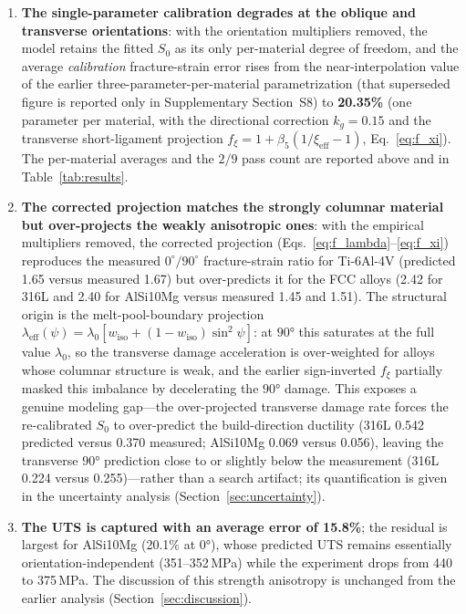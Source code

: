 \documentclass[twocolumn]{sagej}
\begin{document}
\begin{enumerate}\def\labelenumi{(\arabic{enumi})}
    \item \textbf{The single-parameter calibration degrades at the oblique and transverse orientations}: with the orientation multipliers removed, the model retains the fitted $S_0$ as its only per-material degree of freedom, and the average \emph{calibration} fracture-strain error rises from the near-interpolation value of the earlier three-parameter-per-material parametrization (that superseded figure is reported only in Supplementary Section~S8) to \textbf{20.35\%} (one parameter per material, with the directional correction $k_g=0.15$ and the transverse short-ligament projection $f_\xi = 1+\beta_5(1/\xi_\mathrm{eff}-1)$, Eq.~\eqref{eq:f_xi}). The per-material averages and the $2/9$ pass count are reported above and in Table~\ref{tab:results}.
    \item \textbf{The corrected projection matches the strongly columnar material but over-projects the weakly anisotropic ones}: with the empirical multipliers removed, the corrected projection (Eqs.~\eqref{eq:f_lambda}--\eqref{eq:f_xi}) reproduces the measured $0^\circ/90^\circ$ fracture-strain ratio for Ti-6Al-4V (predicted 1.65 versus measured 1.67) but over-predicts it for the FCC alloys (2.42 for 316L and 2.40 for AlSi10Mg versus measured 1.45 and 1.51). The structural origin is the melt-pool-boundary projection $\lambda_{\mathrm{eff}}(\psi) = \lambda_0 [w_{\mathrm{iso}} + (1-w_{\mathrm{iso}})\sin^2\psi]$: at $\ang{90}$ this saturates at the full value $\lambda_0$, so the transverse damage acceleration is over-weighted for alloys whose columnar structure is weak, and the earlier sign-inverted $f_\xi$ partially masked this imbalance by decelerating the $\ang{90}$ damage. This exposes a genuine modeling gap---the over-projected transverse damage rate forces the re-calibrated $S_0$ to over-predict the build-direction ductility (316L 0.542 predicted versus 0.370 measured; AlSi10Mg 0.069 versus 0.056), leaving the transverse $\ang{90}$ prediction close to or slightly below the measurement (316L 0.224 versus 0.255)---rather than a search artifact; its quantification is given in the uncertainty analysis (Section~\ref{sec:uncertainty}).
    \item \textbf{The UTS is captured with an average error of 15.8\%}; the residual is largest for AlSi10Mg (20.1\% at $\ang{0}$), whose predicted UTS remains essentially orientation-independent (351--352\,MPa) while the experiment drops from 440 to 375\,MPa. The discussion of this strength anisotropy is unchanged from the earlier analysis (Section~\ref{sec:discussion}).
\end{enumerate}
\end{document}
